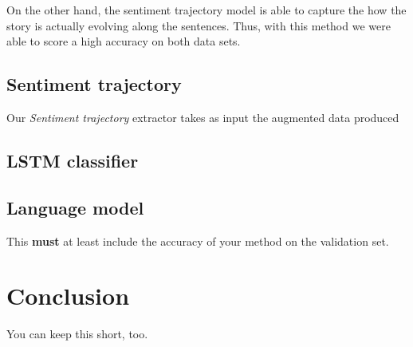 \documentclass{article}
\begin{document}
On the other hand, the sentiment trajectory model is able
to capture the how the story is actually evolving along the sentences. Thus,
with this method we were able to score a high accuracy on both data sets.


\subsection{Sentiment trajectory}

Our {\it Sentiment trajectory} extractor takes as input the augmented data
produced

\subsection{LSTM classifier}
\subsection{Language model}

This {\bf must} at least include the accuracy of your method on the validation set.

\section{Conclusion}
You can keep this short, too. \cite{*}



\end{document}
